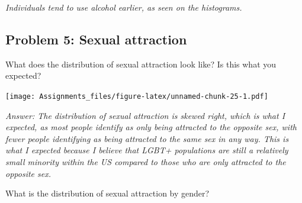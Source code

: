 \documentclass[
]{article}
\newenvironment{Shaded}{\begin{snugshade}}{\end{snugshade}}
\newcommand{\AttributeTok}[1]{\textcolor[rgb]{0.77,0.63,0.00}{#1}}
\newcommand{\DecValTok}[1]{\textcolor[rgb]{0.00,0.00,0.81}{#1}}
\newcommand{\FunctionTok}[1]{\textcolor[rgb]{0.00,0.00,0.00}{#1}}
\newcommand{\NormalTok}[1]{#1}
\newcommand{\OtherTok}[1]{\textcolor[rgb]{0.56,0.35,0.01}{#1}}
\newcommand{\SpecialCharTok}[1]{\textcolor[rgb]{0.00,0.00,0.00}{#1}}
\newcommand{\StringTok}[1]{\textcolor[rgb]{0.31,0.60,0.02}{#1}}
\begin{document}
\emph{Individuals tend to use alcohol earlier, as seen on the
histograms.}

\hypertarget{problem-5-sexual-attraction}{%
\subsection{Problem 5: Sexual
attraction}\label{problem-5-sexual-attraction}}

What does the distribution of sexual attraction look like? Is this what
you expected?

\begin{Shaded}
\end{Shaded}

\texttt{[image: Assignments\_files/figure-latex/unnamed-chunk-25-1.pdf]}

\emph{Answer: The distribution of sexual attraction is skewed right,
which is what I expected, as most people identify as only being
attracted to the opposite sex, with fewer people identifying as being
attracted to the same sex in any way. This is what I expected because I
believe that LGBT+ populations are still a relatively small minority
within the US compared to those who are only attracted to the opposite
sex.}

What is the distribution of sexual attraction by gender?
\end{document}
